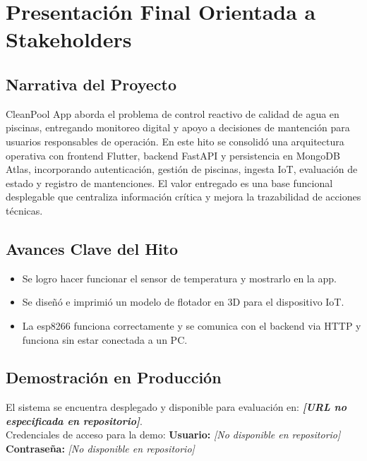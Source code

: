 \documentclass[11pt, a4paper]{article}
\begin{document}
\section{Presentación Final Orientada a Stakeholders}

\subsection{Narrativa del Proyecto}

CleanPool App aborda el problema de control reactivo de calidad de agua en piscinas, entregando monitoreo digital y apoyo a decisiones de mantención para usuarios responsables de operación. En este hito se consolidó una arquitectura operativa con frontend Flutter, backend FastAPI y persistencia en MongoDB Atlas, incorporando autenticación, gestión de piscinas, ingesta IoT, evaluación de estado y registro de mantenciones. El valor entregado es una base funcional desplegable que centraliza información crítica y mejora la trazabilidad de acciones técnicas.

\subsection{Avances Clave del Hito}

\begin{itemize}
  \item Se logro hacer funcionar el sensor de temperatura y mostrarlo en la app.
  \item Se diseñó e imprimió un modelo de flotador en 3D para el dispositivo IoT.
  \item La esp8266 funciona correctamente y se comunica con el backend via HTTP y funciona sin estar conectada a un PC.
\end{itemize}

\subsection{Demostración en Producción}

\begin{notebox}
  El sistema se encuentra desplegado y disponible para evaluación en: \textbf{\textit{[URL no especificada en repositorio]}}. \\
  Credenciales de acceso para la demo: \textbf{Usuario:} \textit{[No disponible en repositorio]} \quad \textbf{Contraseña:} \textit{[No disponible en repositorio]}
\end{notebox}
\end{document}
